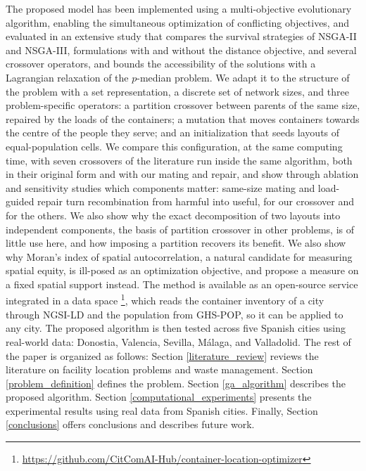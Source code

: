 The proposed model has been implemented using a multi-objective evolutionary algorithm, enabling the simultaneous optimization of conflicting objectives, and evaluated in an extensive study that compares the survival strategies of NSGA-II and NSGA-III, formulations with and without the distance objective, and several crossover operators, and bounds the accessibility of the solutions with a Lagrangian relaxation of the $p$-median problem. We adapt it to the structure of the problem with a set representation, a discrete set of network sizes, and three problem-specific operators: a partition crossover between parents of the same size, repaired by the loads of the containers; a mutation that moves containers towards the centre of the people they serve; and an initialization that seeds layouts of equal-population cells. We compare this configuration, at the same computing time, with seven crossovers of the literature run inside the same algorithm, both in their original form and with our mating and repair, and show through ablation and sensitivity studies which components matter: same-size mating and load-guided repair turn recombination from harmful into useful, for our crossover and for the others. We also show why the exact decomposition of two layouts into independent components, the basis of partition crossover in other problems, is of little use here, and how imposing a partition recovers its benefit. We also show why Moran's index of spatial autocorrelation, a natural candidate for measuring spatial equity, is ill-posed as an optimization objective, and propose a measure on a fixed spatial support instead. The method is available as an open-source service integrated in a data space \footnote{\url{https://github.com/CitComAI-Hub/container-location-optimizer}}, which reads the container inventory of a city through NGSI-LD and the population from GHS-POP, so it can be applied to any city. The proposed algorithm is then tested across five Spanish cities using real-world data: Donostia, Valencia, Sevilla, Málaga, and Valladolid. The rest of the paper is organized as follows: Section \ref{literature_review} reviews the literature on facility location problems and waste management. Section \ref{problem_definition} defines the problem. Section \ref{ga_algorithm} describes the proposed algorithm. Section \ref{computational_experiments} presents the experimental results using real data from Spanish cities. Finally, Section \ref{conclusions} offers conclusions and describes future work.


 